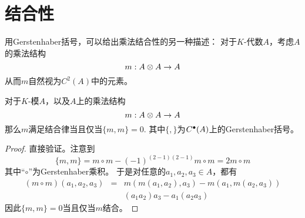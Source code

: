 
\section{结合性}

用Gerstenhaber括号，可以给出乘法结合性的另一种描述：
对于$K$-代数$A$，考虑$A$的乘法结构
$$m:A\otimes A\to A$$
从而$m$自然视为$C^2(A)$中的元素。

\begin{lemma}对于$K$-模$A$，以及$A$上的乘法结构
$$m:A\otimes A\to A$$
那么$m$满足结合律当且仅当$\{m,m\}=0$.
其中$\{,\}$为$C^{\bullet}(A)$上的Gerstenhaber括号。
\end{lemma}
\begin{proof}
直接验证。注意到
$$\{m,m\}=m\circ m-(-1)^{(2-1)(2-1)}m\circ m=2m\circ m$$
其中“$\circ$”为Gerstenhaber乘积。
于是对任意的$a_1,a_2,a_3\in A$，都有
\begin{eqnarray*}
     (m\circ m)(a_1,a_2,a_3)
&=&
     m(m(a_1,a_2),a_3)-m(a_1,m(a_2,a_3))\\
& &
     (a_1a_2)a_3-a_1(a_2a_3)
\end{eqnarray*}
因此$\{m,m\}=0$当且仅当$m$结合。
\end{proof}




